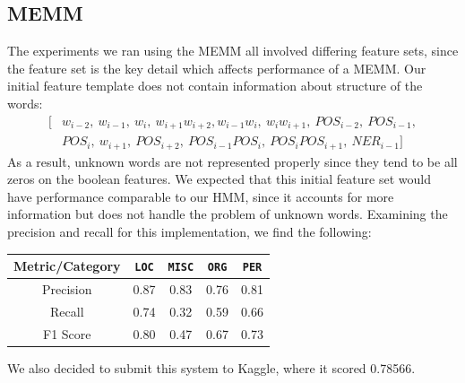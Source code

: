 \documentclass[12pt]{article}
\begin{document}
\subsection{MEMM}
The experiments we ran using the MEMM all involved differing feature sets, since the feature set is the key detail which affects performance of a MEMM. Our initial feature template does not contain information about structure of the words: 
\begin{equation*}
\begin{split}
[&w_{i - 2},\ w_{i - 1},\ w_i,\ w_{i + 1}w_{i + 2},
w_{i - 1}w_i,\ w_iw_{i + 1},\ POS_{i - 2},\ POS_{i - 1},\\
&POS_i,\ w_{i + 1},\ POS_{i + 2}, \ POS_{i - 1}POS_i,\ POS_iPOS_{i + 1},\ NER_{i - 1}
]
\end{split}
\end{equation*}
As a result, unknown words are not represented properly since they tend to be all zeros on the boolean features. We expected that this initial feature set would have performance comparable to our HMM, since it accounts for more information but does not handle the problem of unknown words. Examining the precision and recall for this implementation, we find the following:
\begin{center}
	\begin{tabular}{|c|c|c|c|c|}
		\hline
		\textbf{Metric/Category} & {\tt LOC} & {\tt MISC} & {\tt ORG} & {\tt PER}\\
		\hline
		Precision & 0.87 & 0.83 & 0.76 & 0.81\\
		\hline
		Recall & 0.74 & 0.32 & 0.59 & 0.66\\
		\hline
		F1 Score & 0.80 & 0.47 & 0.67 & 0.73\\
		\hline
	\end{tabular}
\end{center}
We also decided to submit this system to Kaggle, where it scored 0.78566. 
\end{document}
